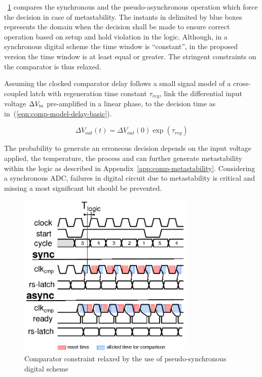 \figurename~\ref{fig:sar-sync-async} compares the synchronous and the pseudo-asynchronous operation which force the decision in case of metastability. The instants in delimited by blue boxes represents the domain when the decision shall be made to ensure correct operation based on setup and hold violation in the logic. Although, in a synchronous digital scheme the time window is ``constant'', in the proposed version the time window is at least equal or greater. The stringent constraints on the comparator is thus relaxed. 

Assuming the clocked comparator delay follows a small signal model of a cross-coupled latch with regeneration time constant \(\tau_{reg} \), link the differential input voltage \(\Delta V_{\rm in}\) pre-amplified in a linear phase, to the decision time as in~(\ref{eqn:comp-model-delay-basic}).

\begin{equation}
	\label{eqn:comp-model-delay-basic}
\Delta V_{out}(t) = \Delta V_{out}(0) \exp\left(\tau_{reg}\right)
\end{equation}

The probability to generate an erroneous decision depends on the input voltage applied, the temperature, the process and can further generate metastability  within the logic as described in Appendix~\ref{app:comp-metastability}. Considering a synchronous ADC, failures in digital circuit due to metastability is critical and missing a most significant bit should be prevented.

\begin{figure}[htp]
	\centering
	\includegraphics[width=0.75\textwidth]{Chapter4/Figs/sar-comp-constraint.ps}
	\caption{Comparator constraint relaxed by the use of pseudo-synchronous digital scheme}
	\label{fig:sar-sync-async}
\end{figure}

